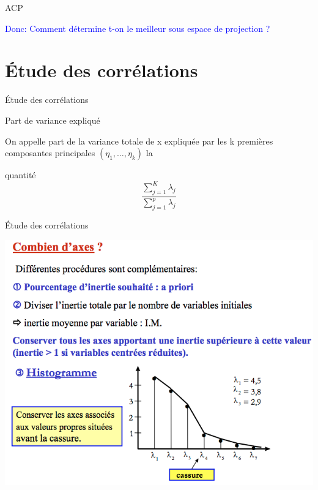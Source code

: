 \documentclass[12pt]{beamer}
\begin{document}



\begin{frame}{ACP }


\begin{Large}
\textcolor{blue}{Donc: Comment détermine t-on le meilleur sous espace de projection ?}
\end{Large}

\end{frame}




\section{Étude des corrélations}

\begin{frame}{Étude des corrélations }

 \begin{block}{Part de variance expliqué}
 
 On appelle part de la variance totale de x expliquée par les k
premières composantes principales $(\eta_1, \ldots, \eta_k)$ la 

quantité  $$ \frac{\sum_{j=1}^K\lambda_j}{\sum_{j=1}^p\lambda_j} $$ 
 
 \end{block}

\end{frame}


\begin{frame}{Étude des corrélations }


 \includegraphics[scale=0.4]{Kaiser.png}

\end{frame}
\end{document}
